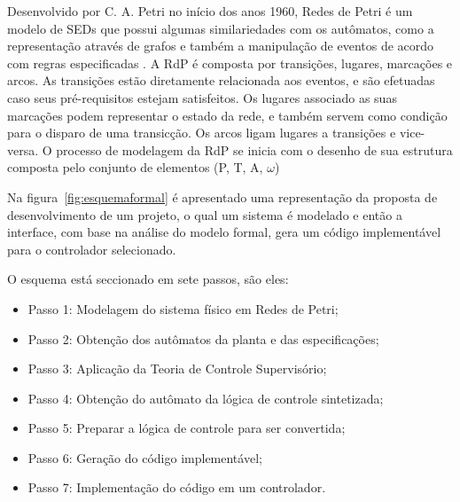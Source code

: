 Desenvolvido por C. A. Petri no in\'icio dos anos 1960, Redes de Petri \'e um modelo de SEDs que possui algumas similariedades com os aut\^omatos, como a representa\c{c}\~ao atrav\'es de grafos e tamb\'em a manipula\c{c}\~ao de eventos de acordo com regras especificadas \cite{Cassandras2008}. A RdP \'e composta por transi\c{c}\~oes, lugares, marca\c{c}\~oes e arcos. As transi\c{c}\~oes est\~ao diretamente relacionada aos eventos, e s\~ao efetuadas caso seus pr\'e-requisitos estejam satisfeitos. Os lugares associado as suas marca\c{c}\~oes podem representar o estado da rede, e tamb\'em servem como condi\c{c}\~ao para o disparo de uma transic\c{c}\~ao. Os arcos ligam lugares a transi\c{c}\~oes e vice-versa.
O processo de modelagem da RdP se inicia com o desenho de sua estrutura composta pelo conjunto de elementos (P, T, A, $\omega$)

Na figura~\ref{fig:esquemaformal} é apresentado uma representa\c{c}\~ao da proposta de desenvolvimento de um projeto, o qual um sistema \'e modelado e ent\~ao a interface, com base na an\'alise do modelo formal, gera um c\'odigo implement\'avel para o controlador selecionado. 

 O esquema est\'a seccionado em sete passos, s\~ao eles:
 
 \begin{itemize}
 	\item Passo 1: Modelagem do sistema f\'isico em Redes de Petri;
 	\item Passo 2: Obten\c{c}\~ao dos aut\^omatos da planta e das especifica\c{c}\~oes;
 	\item Passo 3: Aplica\c{c}\~ao da Teoria de Controle Supervis\'orio;
 	\item Passo 4: Obten\c{c}\~ao do aut\^omato da l\'ogica de controle sintetizada;
 	\item Passo 5: Preparar a l\'ogica de controle para ser convertida;
 	\item Passo 6: Gera\c{c}\~ao do c\'odigo implement\'avel;
 	\item Passo 7: Implementa\c{c}\~ao do c\'odigo em um controlador.
 \end{itemize}

